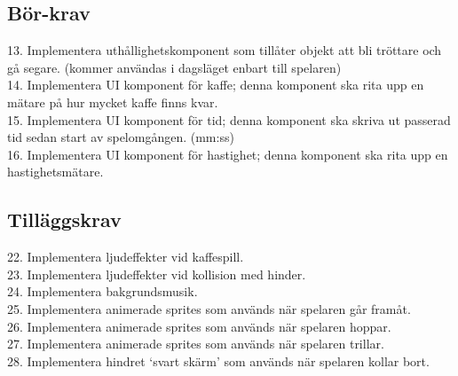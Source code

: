 \documentclass{template}
\begin{document}
\subsection{Bör-krav}
13. Implementera uthållighetskomponent som tillåter objekt att bli tröttare och gå segare. (kommer användas i dagsläget enbart till spelaren)\\
14. Implementera UI komponent för kaffe; denna komponent ska rita upp en mätare på hur mycket kaffe finns kvar.\\
15. Implementera UI komponent för tid; denna komponent ska skriva ut passerad tid sedan start av spelomgången. (mm:ss)\\
16. Implementera UI komponent för hastighet; denna komponent ska rita upp en hastighetsmätare.\\

\subsection{Tilläggskrav}
22. Implementera ljudeffekter vid kaffespill.\\
23. Implementera ljudeffekter vid kollision med hinder.\\
24. Implementera bakgrundsmusik.\\
25. Implementera animerade sprites som används när spelaren går framåt.\\
26. Implementera animerade sprites som används när spelaren hoppar.\\
27. Implementera animerade sprites som används när spelaren trillar.\\
28. Implementera hindret `svart skärm' som används när spelaren kollar bort.\\
\end{document}
